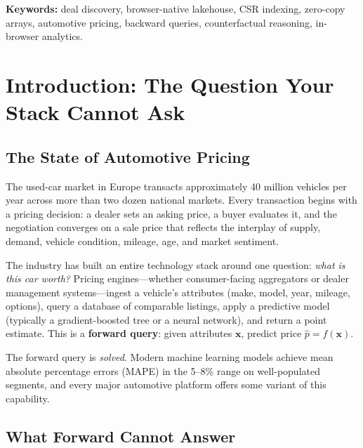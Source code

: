 \documentclass[11pt,a4paper,twoside]{book}
\begin{document}
\textbf{Keywords:} deal discovery, browser-native lakehouse, CSR indexing, zero-copy arrays,
automotive pricing, backward queries, counterfactual reasoning, in-browser analytics.

\vspace*{\fill}
\newpage

\tableofcontents
\newpage

\chapter{Introduction: The Question Your Stack Cannot Ask}

\section{The State of Automotive Pricing}

The used-car market in Europe transacts approximately 40 million vehicles per year across more
than two dozen national markets. Every transaction begins with a pricing decision: a dealer sets
an asking price, a buyer evaluates it, and the negotiation converges on a sale price that reflects
the interplay of supply, demand, vehicle condition, mileage, age, and market sentiment.

The industry has built an entire technology stack around one question: \textit{what is this car
worth?} Pricing engines---whether consumer-facing aggregators or dealer management systems---ingest
a vehicle's attributes (make, model, year, mileage, options), query a database of comparable
listings, apply a predictive model (typically a gradient-boosted tree or a neural network), and
return a point estimate. This is a \textbf{forward query}: given attributes $\mathbf{x}$, predict
price $\hat{p} = f(\mathbf{x})$.

The forward query is \textit{solved}. Modern machine learning models achieve mean absolute
percentage errors (MAPE) in the 5--8\% range on well-populated segments, and every major
automotive platform offers some variant of this capability.

\section{What Forward Cannot Answer}
\end{document}
